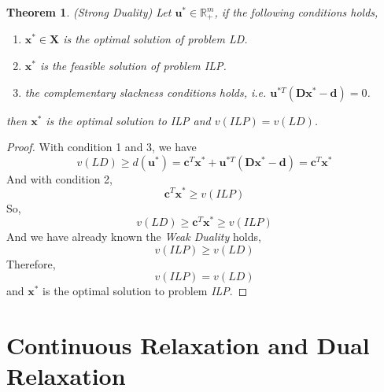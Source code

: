 \documentclass{article}
\newtheorem{thm}{Theorem}
\begin{document}
\begin{thm}
	(Strong Duality) Let $\bm{u}^* \in \mathbb{R}_+^m$, if the following conditions holds,
	\begin{enumerate}
		\item $\bm{x}^* \in \bm{X}$ is the optimal solution of problem \textit{LD}.
		\item $\bm{x}^*$ is the feasible solution of problem \textit{ILP}.
		\item the complementary slackness conditions holds, i.e. $\bm{u}^{*T}(\bm{D}\bm{x}^* - \bm{d}) = 0$.
	\end{enumerate} 
	then $\bm{x}^*$ is the optimal solution to \textit{ILP} and $v(ILP) = v(LD)$.
\end{thm}

\begin{proof}
	With condition 1 and 3, we have 
	\begin{equation}
		v(LD) \geq d(\bm{u}^*) = \bm{c}^T\bm{x}^* + \bm{u}^{*T}(\bm{D}\bm{x}^*-\bm{d}) = \bm{c}^T\bm{x}^*
	\end{equation}
	And with condition 2, 
	\begin{equation}
		\bm{c}^T\bm{x}^* \geq v(ILP)
	\end{equation}
	So,
	\begin{equation}
		v(LD) \geq \bm{c}^T\bm{x}^* \geq v(ILP)
	\end{equation}
	And we have already known the \textit{Weak Duality} holds,
	\begin{equation}
		v(ILP) \geq v(LD)
	\end{equation}
	Therefore,
	\begin{equation}
		v(ILP) = v(LD)
	\end{equation}
	and $\bm{x}^*$ is the optimal solution to problem \textit{ILP}.
\end{proof}


\section{Continuous Relaxation and Dual Relaxation}
 
\end{document}
